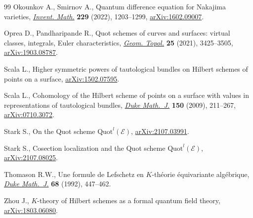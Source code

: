 \begin{thebibliography}{99}
Okounkov A., Smirnov A., Quantum difference equation for {N}akajima varieties,
 \href{https://doi.org/10.1007/s00222-022-01125-w}{\textit{Invent. Math.}} \textbf{229} (2022), 1203--1299, \href{https://arxiv.org/abs/1602.09007}{arXiv:1602.09007}.

Oprea D., Pandharipande R., Quot schemes of curves and surfaces: virtual
 classes, integrals, {E}uler characteristics, \href{https://doi.org/10.2140/gt.2021.25.3425}{\textit{Geom. Topol.}}
 \textbf{25} (2021), 3425--3505, \href{https://arxiv.org/abs/1903.08787}{arXiv:1903.08787}.

Scala L., Higher symmetric powers of tautological bundles on {H}ilbert schemes
 of points on a surface, \href{https://arxiv.org/abs/1502.07595}{arXiv:1502.07595}.

Scala L., Cohomology of the {H}ilbert scheme of points on a surface with values
 in representations of tautological bundles, \href{https://doi.org/10.1215/00127094-2009-050}{\textit{Duke Math.~J.}}
 \textbf{150} (2009), 211--267, \href{https://arxiv.org/abs/0710.3072}{arXiv:0710.3072}.

Stark S., On the Quot scheme {$\mathrm{Quot}^l(\mathscr{E})$},
 \href{https://arxiv.org/abs/2107.03991}{arXiv:2107.03991}.

Stark S., Cosection localization and the Quot scheme
 $\mathrm{Quot}^{l}(\mathscr{E})$, \href{https://arxiv.org/abs/2107.08025}{arXiv:2107.08025}.

Thomason R.W., Une formule de {L}efschetz en {$K$}-th\'eorie \'equivariante
 alg\'ebrique, \href{https://doi.org/10.1215/S0012-7094-92-06817-7}{\textit{Duke Math.~J.}} \textbf{68} (1992), 447--462.

Zhou J., {$K$}-theory of {H}ilbert schemes as a formal quantum field theory,
 \href{https://arxiv.org/abs/1803.06080}{arXiv:1803.06080}.

\end{thebibliography}
